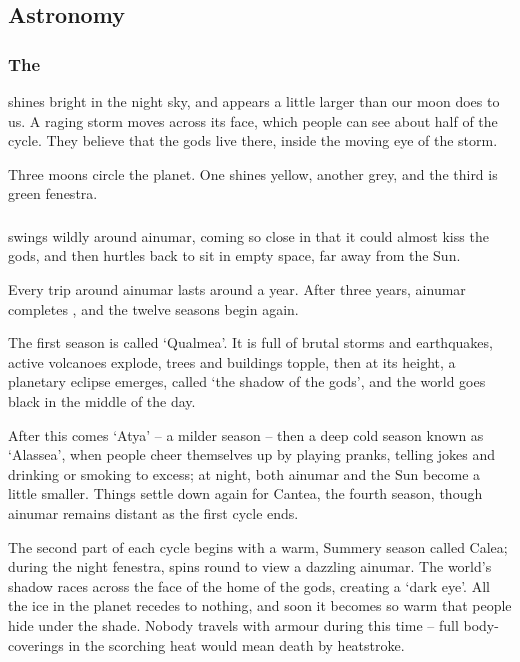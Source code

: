 \begin{multicols}{2}

\subsection{Astronomy}

\subsubsection{The }
shines bright in the night sky, and appears a little larger than our moon does to us.
A raging storm moves across its face, which people can see about half of the \gls{cycle}.
They believe that the gods live there, inside the moving eye of the storm.

Three moons circle the planet.
One shines yellow, another grey, and the third is green \gls{fenestra}.

\subsubsection{}
swings wildly around \gls{ainumar}, coming so close in that it could almost kiss the gods, and then hurtles back to sit in empty space, far away from the Sun.

Every trip around \gls{ainumar} lasts around a year.
After three years, \gls{ainumar} completes , and the twelve seasons begin again.

The first season is called `\gls{Qualmea}'.
It is full of brutal storms and earthquakes, active volcanoes explode, trees and buildings topple, then at its height, a planetary eclipse emerges, called `the shadow of the gods', and the world goes black in the middle of the day.

After this comes `\gls{Atya}' -- a milder season -- then a deep cold season known as `\gls{Alassea}', when people cheer themselves up by playing pranks, telling jokes and drinking or smoking to excess; at night, both \gls{ainumar} and the Sun become a little smaller.
Things settle down again for \gls{Cantea}, the fourth season, though \gls{ainumar} remains distant as the first \gls{cycle} ends.

The second part of each \gls{cycle} begins with a warm, Summery season called \gls{Calea}; during the night \gls{fenestra}, spins round to view a dazzling \gls{ainumar}.
The world's shadow races across the face of the home of the gods, creating a `dark eye'.
All the ice in the planet recedes to nothing, and soon it becomes so warm that people hide under the shade.
Nobody travels with armour during this time -- full body-coverings in the scorching heat would mean death by heatstroke.


\end{multicols}

